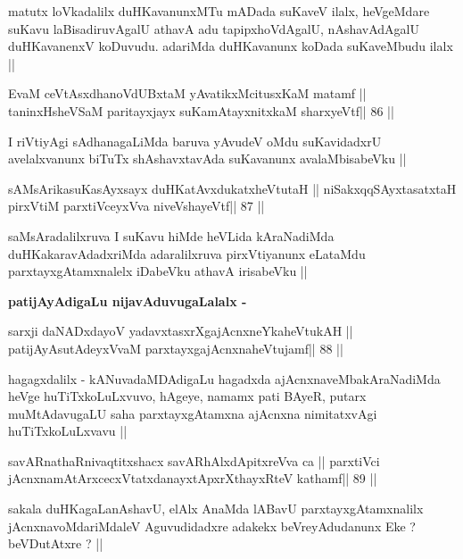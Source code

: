 \begin{artha}
matutx loVkadalilx duHKavanunxMTu mADada suKaveV ilalx, heVgeMdare
suKavu laBisadiruvAgalU athavA adu tapipxhoVdAgalU, nAshavAdAgalU
duHKavanenxV koDuvudu. adariMda duHKavanunx koDada suKaveMbudu ilalx ||
\end{artha}

\begin{shl}
EvaM ceVtAsxdhanoVdUBxtaM yAvatikxMcitusxKaM matamf ||
taninxHsheVSaM paritayxjayx suKamAtayxnitxkaM sharxyeVtf\hfill || 86 ||
\end{shl}

\begin{artha}
I riVtiyAgi sAdhanagaLiMda baruva yAvudeV oMdu suKavidadxrU
avelalxvanunx biTuTx shAshavxtavAda suKavanunx avalaMbisabeVku ||
\end{artha}

\begin{shl}
sAMsArikasuKasAyxsayx duHKatAvxdukatxheVtutaH ||
niSakxqqSAyxtasatxtaH pirxVtiM parxtiVceyxVva niveVshayeVtf\hfill || 87 ||
\end{shl}

\begin{artha}
saMsAradalilxruva I suKavu hiMde heVLida kAraNadiMda
duHKakaravAdadxriMda adaralilxruva pirxVtiyanunx eLataMdu
parxtayxgAtamxnalelx iDabeVku athavA irisabeVku ||
\end{artha}

\begin{artha}
\textbf{patijAyAdigaLu nijavAduvugaLalalx -}
\end{artha}

\begin{shl}
sarxji daNADxdayoV yadavxtasxrXgajAcnxneYkaheVtukAH ||
patijAyAsutAdeyxVvaM parxtayxgajAcnxnaheVtujamf\hfill || 88 ||
\end{shl}

\begin{artha}
hagagxdalilx - kANuvadaMDAdigaLu hagadxda ajAcnxnaveMbakAraNadiMda
heVge huTiTxkoLuLxvuvo, hAgeye, namamx pati BAyeR, putarx
muMtAdavugaLU saha parxtayxgAtamxna ajAcnxna nimitatxvAgi
huTiTxkoLuLxvavu ||
\end{artha}

\begin{shl}
savARnathaRnivaqtitxshacx savARhAlxdApitxreVva ca ||
parxtiVci jAcnxnamAtArxcecxVtatxdanayxtApxrXthayxRteV kathamf\hfill || 89 ||
\end{shl}

\begin{artha}
sakala duHKagaLanAshavU, elAlx AnaMda lABavU parxtayxgAtamxnalilx
jAcnxnavoMdariMdaleV Aguvudidadxre adakekx beVreyAdudanunx Eke ?
beVDutAtxre ? || 
\end{artha}

